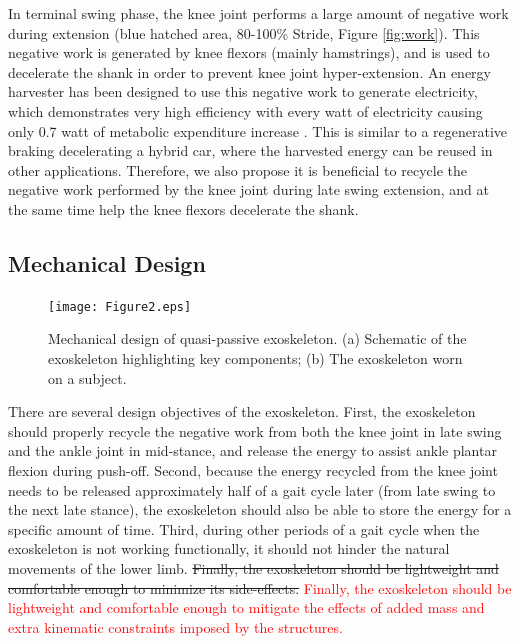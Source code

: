 \documentclass[twocolumn,cleanfoot,10pt]{asme2ej}
\begin{document}
In terminal swing phase, the knee joint performs a large amount of negative work during extension (blue hatched area, 80-100\% Stride, Figure \ref{fig:work}).
This negative work is generated by knee flexors (mainly hamstrings), and is used to decelerate the shank in order to prevent knee joint hyper-extension.
An energy harvester has been designed to use this negative work to generate electricity, which demonstrates very high efficiency with every watt of electricity causing only 0.7 watt of metabolic expenditure increase \cite{RN18}.
This is similar to a regenerative braking decelerating a hybrid car, where the harvested energy can be reused in other applications.
Therefore, we also propose it is beneficial to recycle the negative work performed by the knee joint during late swing extension, and at the same time help the knee flexors decelerate the shank.

\subsection{Mechanical Design}

\begin{figure}[b]
	\centering
	\texttt{[image: Figure2.eps]}
	\caption{Mechanical design of quasi-passive exoskeleton.
	(a) Schematic of the exoskeleton highlighting key components; (b) The exoskeleton worn on a subject.}
	\label{fig:model}   
\end{figure}

There are several design objectives of the exoskeleton.
First, the exoskeleton should properly recycle the negative work from both the knee joint in late swing and the ankle joint in mid-stance, and release the energy to assist ankle plantar flexion during push-off.
Second, because the energy recycled from the knee joint needs to be released approximately half of a gait cycle later (from late swing to the next late stance), the exoskeleton should also be able to store the energy for a specific amount of time.
Third, during other periods of a gait cycle when the exoskeleton is not working functionally, it should not hinder the natural movements of the lower limb.
\sout{Finally, the exoskeleton should be lightweight and comfortable enough to minimize its side-effects.}
\textcolor{red}{Finally, the exoskeleton should be lightweight and comfortable enough to mitigate the effects of added mass and extra kinematic constraints imposed by the structures.}
\end{document}
